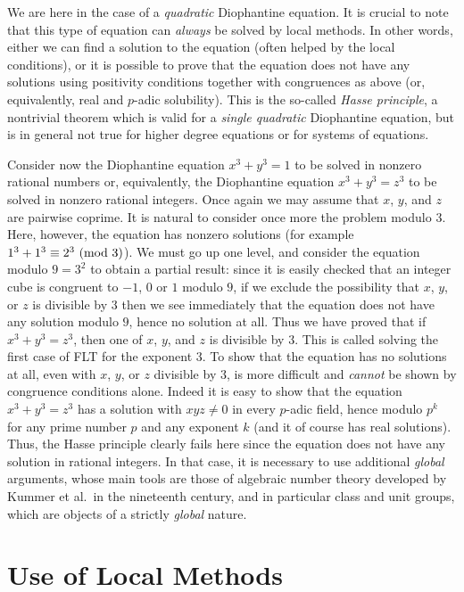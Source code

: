 \documentclass[12pt,a4paper]{article}
\renewcommand{\pmod}[1]{\allowbreak\ ({\rm{mod}}\,\,#1)}
\begin{document}
We are here in the case of a \emph{quadratic} Diophantine equation. It is 
crucial to note that this type of equation can \emph{always} be solved by
local methods. In other words, either we can find a solution to the equation
(often helped by the local conditions), or it is possible to prove 
that the equation does not have any solutions using positivity conditions
together with congruences as above (or, equivalently, real and $p$-adic 
solubility). This is the so-called \emph{Hasse principle},
a nontrivial theorem which is valid for a \emph{single quadratic} Diophantine 
equation, but is in general not true for higher degree equations or for 
systems of equations.

\smallskip

Consider now the Diophantine equation $x^3+y^3=1$ to be solved in nonzero
rational numbers or, equivalently, the Diophantine equation $x^3+y^3=z^3$ to be
solved in nonzero rational integers. Once again we may assume that $x$, $y$,
and $z$ are pairwise coprime. It is natural to consider once more the problem 
modulo $3$. Here, however, the equation has nonzero solutions (for example
$1^3+1^3\equiv2^3\pmod{3}$). We must go up one level, and consider the equation
modulo $9=3^2$ to obtain a partial result: since it is easily checked that
an integer cube is congruent to $-1$, $0$ or $1$ modulo $9$, if we exclude
the possibility that $x$, $y$, or $z$ is divisible by $3$ then we see 
immediately that the equation does not have any solution modulo $9$, hence
no solution at all. Thus we have proved that if $x^3+y^3=z^3$, then one of
$x$, $y$, and $z$ is divisible by $3$. This is called solving the first case 
of FLT for the exponent $3$. To show that the equation has no solutions at all,
even with $x$, $y$, or $z$ divisible by $3$, is more difficult and 
\emph{cannot} be shown by congruence conditions alone. Indeed it is easy to
show that the equation $x^3+y^3=z^3$ has a solution with $xyz\ne0$ in every 
$p$-adic field, hence modulo $p^k$ for any prime number $p$ and any exponent 
$k$ (and it of course has real solutions). Thus, the Hasse principle clearly 
fails here since the equation does not have any solution in rational integers.
In that case, it is necessary to use additional \emph{global} arguments, whose 
main tools are those of algebraic number theory developed by Kummer et al.~in
the nineteenth century, and in particular class and unit groups, which are 
objects of a strictly \emph{global} nature.

\section{Use of Local Methods}
\end{document}
